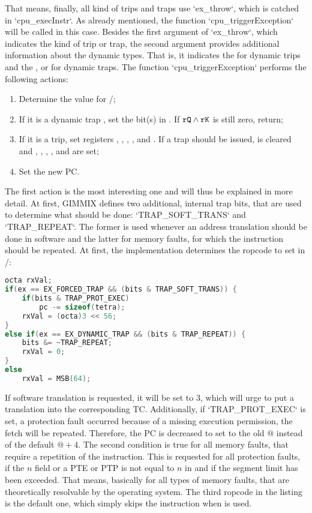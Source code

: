 That means, finally, all kind of trips and traps use `ex_throw`, which is catched in `cpu_execInstr`. As already mentioned, the function `cpu_triggerException` will be called in this case. Besides the first argument of `ex_throw`, which indicates the kind of trip or trap, the second argument provides additional information about the dynamic types. That is, it indicates the  for dynamic trips and the ,  or  for dynamic traps. The function `cpu_triggerException` performs the following actions:
\begin{enumerate}
	\item Determine the value for /;
	\item If it is a dynamic trap , set the bit(s) in . If ${\tt rQ} \land {\tt rK}$ is still zero, return;
	\item If it is a trip, set registers , , , ,  and . If a trap should be issued,  is cleared and , , , ,  and  are set;
	\item Set the new \gls{PC}.
\end{enumerate}
The first action is the most interesting one and will thus be explained in more detail. At first, GIMMIX defines two additional, internal trap bits, that are used to determine what should be done: `TRAP_SOFT_TRANS` and `TRAP_REPEAT`. The former is used whenever an address translation should be done in software and the latter for memory faults, for which the instruction should be repeated. At first, the implementation determines the ropcode to set in /:
\begin{lstlisting}[language=C,caption={Determining \sr{X}/\sr{XX} in {\tt cpu\_triggerException}, part 1}]
octa rxVal;
if(ex == EX_FORCED_TRAP && (bits & TRAP_SOFT_TRANS)) {
	if(bits & TRAP_PROT_EXEC)
		pc -= sizeof(tetra);
	rxVal = (octa)3 << 56;
}
else if(ex == EX_DYNAMIC_TRAP && (bits & TRAP_REPEAT)) {
	bits &= ~TRAP_REPEAT;
	rxVal = 0;
}
else
	rxVal = MSB(64);
\end{lstlisting}
If software translation is requested, it will be set to 3, which will urge  to put a translation into the corresponding TC. Additionally, if `TRAP_PROT_EXEC` is set, \ie a protection fault occurred because of a missing execution permission, the fetch will be repeated. Therefore, the \gls{PC} is decreased to set  to the old $@$ instead of the default $@+4$. The second condition is true for all memory faults, that require a repetition of the instruction. This is requested for all protection faults, if the $n$ field or a PTE or PTP is not equal to $n$ in  and if the segment limit has been exceeded. That means, basically for all types of memory faults, that are theoretically resolvable by the operating system. The third ropcode in the listing is the default one, which simply skips the instruction when  is used.
 

